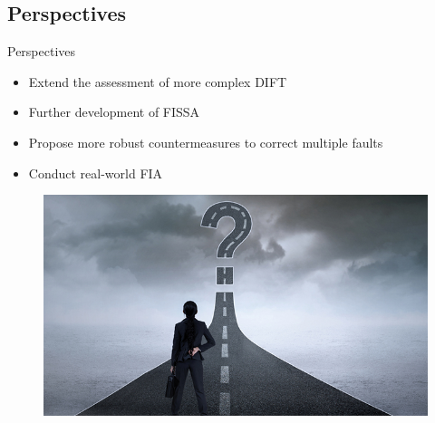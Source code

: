 \subsection{Perspectives}
\begin{frame}{Perspectives}
    \begin{block}{}
        \begin{itemize}
            [triangle]
            \item Extend the assessment of more complex DIFT
            \item Further development of FISSA
            \item Propose more robust countermeasures to correct multiple faults
            \item Conduct real-world FIA
        \end{itemize}
    \end{block}

    \begin{figure}
        \centering
        \includegraphics[height=.25\textheight]{src/6_conclusion/img/perspectives.jpg}
    \end{figure}
\end{frame}
